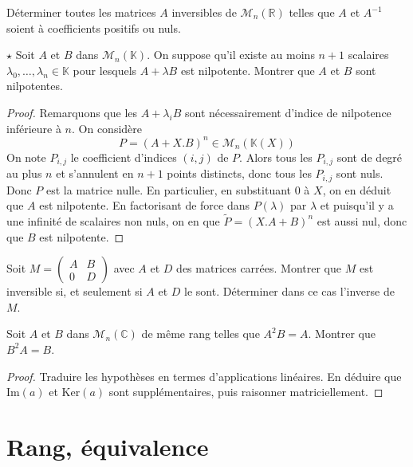 \documentclass[french,a4paper]{article}
\newcommand{\R}{\mathbb{R}}
\newcommand{\C}{\mathbb{C}}
\newcommand{\K}{\mathbb{K}}
\newcommand{\inv}{^{-1}}
\renewcommand{\ker}{\text{Ker}}
\newcommand{\im}{\text{Im}}
\theoremstyle{plain}
\theoremstyle{definition}
\theoremstyle{remark}
\begin{document}
\begin{ex}{}
	Déterminer toutes les matrices $A$ inversibles de $\mathcal{M}_n(\R)$ telles que $A$ et $A\inv$ soient à coefficients positifs ou nuls.
\end{ex}

\begin{ex}{$\star$}
	Soit $A$ et $B$ dans $\mathcal{M}_n(\K)$. On suppose qu'il existe au moins $n+1$ scalaires $\lambda_0,\ldots,\lambda_n\in\K$ pour lesquels $A+\lambda B$ est nilpotente. Montrer que $A$ et $B$ sont nilpotentes.
\end{ex}
\begin{proof}
	Remarquons que les $A+\lambda_i B$ sont nécessairement d'indice de nilpotence inférieure à $n$. On considère $$P=(A+X.B)^n\in\mathcal{M}_n(\K(X))$$ On note $P_{i,j}$ le coefficient d'indices $(i,j)$ de $P$. Alors tous les $P_{i,j}$ sont de degré au plus $n$ et s'annulent en $n+1$ points distincts, donc tous les $P_{i,j}$ sont nuls. Donc $P$ est la matrice nulle. En particulier, en substituant $0$ à $X$, on en déduit que $A$ est nilpotente. En factorisant de force dans $P(\lambda)$ par $\lambda$ et puisqu'il y a une infinité de scalaires non nuls, on en que $\tilde{P}=(X.A+B)^n$ est aussi nul, donc que $B$ est nilpotente.
\end{proof}

\begin{ex}{}
	Soit $M=\displaystyle\begin{pmatrix}
		A&B\\
		0&D
	\end{pmatrix}$ avec $A$ et $D$ des matrices carrées. Montrer que $M$ est inversible si, et seulement si $A$ et $D$ le sont. Déterminer dans ce cas l'inverse de $M$.
\end{ex}

\begin{ex}{}
	Soit $A$ et $B$ dans $\mathcal{M}_n(\C)$ de même rang telles que $A^2B=A$. Montrer que $B^2A=B$.
\end{ex}
\begin{proof}
	Traduire les hypothèses en termes d'applications linéaires. En déduire que $\im(a)$ et $\ker(a)$ sont supplémentaires, puis raisonner matriciellement.
\end{proof}

\section{Rang, équivalence}
\end{document}
